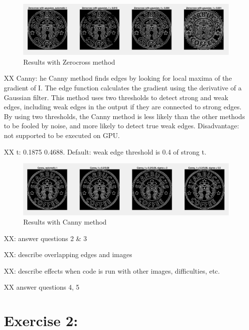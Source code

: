 \documentclass[11pt]{article}
\begin{document}
\begin{figure}[!hbt]
  \includegraphics[width=\textwidth]{im5}
  \caption{Results with Zerocross method}
  \label{fig:im5}
\end{figure}

XX Canny: he Canny method finds edges by looking for local maxima of the gradient of I. The edge function calculates the gradient using the derivative of a Gaussian filter. This method uses two thresholds to detect strong and weak edges, including weak edges in the output if they are connected to strong edges. By using two thresholds, the Canny method is less likely than the other methods to be fooled by noise, and more likely to detect true weak edges. Disadvantage: not supported to be executed on GPU.

XX t: 0.1875    0.4688. Default: weak edge threshold is 0.4 of strong t. 

\begin{figure}[!hbt]
  \includegraphics[width=\textwidth]{im6}
  \caption{Results with Canny method}
  \label{fig:im6}
\end{figure}

XX: answer questions 2 \& 3

XX: describe overlapping edges and images

XX: describe effects when code is run with other images, difficulties, etc.

XX answer questions 4, 5

\section*{Exercise 2:}
\end{document}
